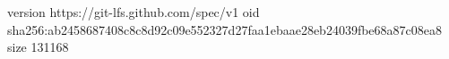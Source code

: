 version https://git-lfs.github.com/spec/v1
oid sha256:ab2458687408c8c8d92c09e552327d27faa1ebaae28eb24039fbe68a87c08ea8
size 131168
